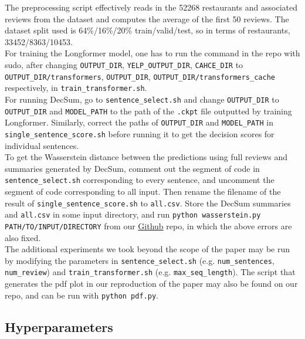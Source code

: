 \documentclass{article}
\begin{document}
The preprocessing script effectively reads in the 52268 restaurants and associated reviews from the dataset and computes the average of the first 50 reviews. The dataset split used is
64\%/16\%/20\% train/valid/test, so in terms of restaurants, 33452/8363/10453. \\

For training the Longformer model, one has to run the command in the repo with sudo, after changing \texttt{OUTPUT\_DIR}, \texttt{YELP\_OUTPUT\_DIR}, \texttt{CAHCE\_DIR} to
\texttt{OUTPUT\_DIR/transformers}, \texttt{OUTPUT\_DIR}, \texttt{OUTPUT\_DIR/transformers\_cache} respectively, in \texttt{train\_transformer.sh}. \\

For running DecSum, go to \texttt{sentence\_select.sh} and change \texttt{OUTPUT\_DIR} to \texttt{OUTPUT\_DIR} and \texttt{MODEL\_PATH} to the path of the \texttt{.ckpt} file outputted by
training Longformer. Similarly,
correct the paths of \texttt{OUTPUT\_DIR} and \texttt{MODEL\_PATH} in \texttt{single\_sentence\_score.sh} before running it to get the decision scores for individual sentences. \\

To get the Wasserstein distance between the predictions using full reviews and summaries generated by DecSum, comment out the segment of code in \texttt{sentence\_select.sh} corresponding to every
sentence, and uncomment the segment of code corresponding to all input. Then rename the filename of the result of \texttt{single\_sentence\_score.sh} to
\texttt{all.csv}. Store the DecSum summaries and \texttt{all.csv} in some input directory, and run \texttt{python wasserstein.py PATH/TO/INPUT/DIRECTORY} from
our \href{https://github.com/ericxiaseattle/CSE517-Project}{Github} repo, in which the above errors are also fixed. \\

The additional experiments we took beyond the scope of the paper may be run by modifying the parameters in \texttt{sentence\_select.sh} (e.g. \texttt{num\_sentences}, \texttt{num\_review}) and
\texttt{train\_transformer.sh} (e.g. \texttt{max\_seq\_length}). The script that generates the pdf plot in our reproduction of the paper may also be found on our repo, and can be run with
\texttt{python pdf.py}.

\subsection{Hyperparameters}
\end{document}
